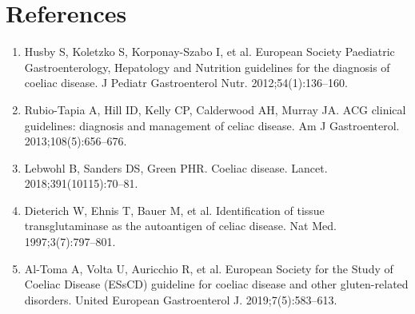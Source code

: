 \section*{References}
\begin{enumerate}
  \item Husby S, Koletzko S, Korponay-Szabo I, et al. European Society Paediatric Gastroenterology, Hepatology and Nutrition guidelines for the diagnosis of coeliac disease. J Pediatr Gastroenterol Nutr. 2012;54(1):136--160.
  \item Rubio-Tapia A, Hill ID, Kelly CP, Calderwood AH, Murray JA. ACG clinical guidelines: diagnosis and management of celiac disease. Am J Gastroenterol. 2013;108(5):656--676.
  \item Lebwohl B, Sanders DS, Green PHR. Coeliac disease. Lancet. 2018;391(10115):70--81.
  \item Dieterich W, Ehnis T, Bauer M, et al. Identification of tissue transglutaminase as the autoantigen of celiac disease. Nat Med. 1997;3(7):797--801.
  \item Al-Toma A, Volta U, Auricchio R, et al. European Society for the Study of Coeliac Disease (ESsCD) guideline for coeliac disease and other gluten-related disorders. United European Gastroenterol J. 2019;7(5):583--613.
\end{enumerate}

\clearpage
